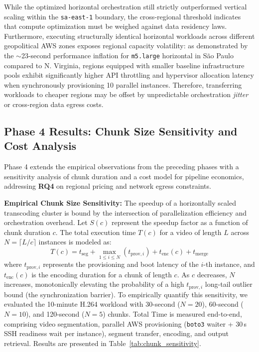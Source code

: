 \documentclass[conference]{IEEEtran}
\begin{document}
While the optimized horizontal orchestration still strictly outperformed vertical scaling within the \texttt{sa-east-1} boundary, the cross-regional threshold indicates that compute optimization must be weighed against data residency laws. Furthermore, executing structurally identical horizontal workloads across different geopolitical AWS zones exposes regional capacity volatility: as demonstrated by the $\sim$23-second performance inflation for \texttt{m5.large} horizontal in São Paulo compared to N. Virginia, regions equipped with smaller baseline infrastructure pools exhibit significantly higher API throttling and hypervisor allocation latency when synchronously provisioning 10 parallel instances. Therefore, transferring workloads to cheaper regions may be offset by unpredictable orchestration \textit{jitter} or cross-region data egress costs.

\subsection{Phase 4 Results: Chunk Size Sensitivity and Cost Analysis}
\label{results-phase4}

Phase 4 extends the empirical observations from the preceding phases with a sensitivity analysis of chunk duration and a cost model for pipeline economics, addressing \textbf{RQ4} on regional pricing and network egress constraints.

\textbf{Empirical Chunk Size Sensitivity:}
The speedup of a horizontally scaled transcoding cluster is bound by the intersection of parallelization efficiency and orchestration overhead. Let $S(c)$ represent the speedup factor as a function of chunk duration $c$. The total execution time $T(c)$ for a video of length $L$ across $N = \lceil L/c \rceil$ instances is modeled as:
\begin{equation}
T(c) = t_{\text{seg}} + \max_{1 \le i \le N} \left( t_{\text{prov},i} \right) + t_{\text{enc}}(c) + t_{\text{merge}}
\end{equation}
where $t_{\text{prov},i}$ represents the provisioning and boot latency of the $i$-th instance, and $t_{\text{enc}}(c)$ is the encoding duration for a chunk of length $c$. As $c$ decreases, $N$ increases, monotonically elevating the probability of a high $t_{\text{prov},i}$ long-tail outlier bound (the synchronization barrier). To empirically quantify this sensitivity, we evaluated the 10-minute H.264 workload with 30-second ($N=20$), 60-second ($N=10$), and 120-second ($N=5$) chunks. Total Time is measured end-to-end, comprising video segmentation, parallel AWS provisioning (\texttt{boto3} waiter + 30\,s SSH readiness wait per instance), segment transfer, encoding, and output retrieval. Results are presented in Table~\ref{tab:chunk_sensitivity}.
\end{document}
